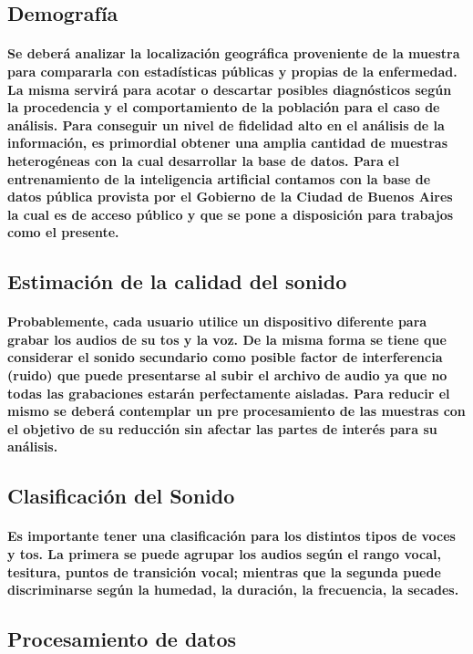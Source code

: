 \documentclass[12pt]{article}
\begin{document}
\subsection{Demografía}
\paragraph{
Se deberá analizar la localización geográfica proveniente de la muestra para compararla con estadísticas públicas y propias de la enfermedad. La misma servirá para acotar o descartar posibles diagnósticos según la procedencia y el comportamiento de la población para el caso de análisis.
Para conseguir un nivel de fidelidad alto en el análisis de la información, es primordial obtener una amplia cantidad de muestras heterogéneas con la cual desarrollar la base de datos.
Para el entrenamiento de la inteligencia artificial contamos con la base de datos pública provista por el Gobierno de la Ciudad de Buenos Aires la cual es de acceso público y que se pone a disposición para trabajos como el presente.}
\subsection{Estimación de la calidad del sonido}
\paragraph{
Probablemente, cada usuario utilice un dispositivo diferente para grabar los audios de su tos y la voz. De la misma forma se tiene que considerar el sonido secundario como posible factor de interferencia (ruido) que puede presentarse al subir el archivo de audio ya que no todas las grabaciones estarán perfectamente aisladas.
Para reducir el mismo se deberá contemplar un pre procesamiento de las muestras con el objetivo de su reducción sin afectar las partes de interés para su análisis.}
\subsection{Clasificación del Sonido}
\paragraph{
Es importante tener una clasificación para los distintos tipos de voces y tos. La primera se puede agrupar los audios según el rango vocal, tesitura, puntos de transición vocal; mientras que la segunda puede discriminarse según la humedad, la duración, la frecuencia, la secades.}
\subsection{Procesamiento de datos}
\end{document}
